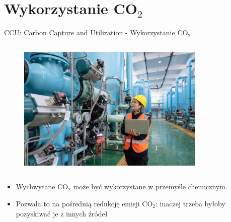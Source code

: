 \section{Wykorzystanie CO$_2$}

\begin{columnframe}{CCU: Carbon Capture and Utilization - Wykorzystanie CO$_2$}
    \begin{column}{0.5\textwidth}
        \begin{figure}
            \centering
            \includegraphics[width=0.8\textwidth, frame]{images/chemical_engineering_stock_image.jpg}
        \end{figure}
    \end{column}
    \begin{column}{0.5\textwidth}
        \begin{itemize}
            \item Wychwytane CO$_2$ może być wykorzystane w przemyśle chemicznym.
            \item Pozwala to na pośrednią redukcję emisji CO$_2$: inaczej trzeba byłoby pozyskiwać je z innych źródeł
        \end{itemize}
    \end{column}
\end{columnframe}



